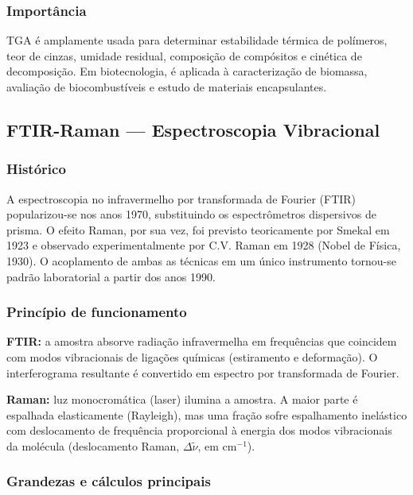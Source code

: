 \subsubsection*{Importância}

TGA é amplamente usada para determinar estabilidade térmica de polímeros,
teor de cinzas, umidade residual, composição de compósitos e cinética de
decomposição. Em biotecnologia, é aplicada à caracterização de biomassa,
avaliação de biocombustíveis e estudo de materiais encapsulantes.

\subsection{FTIR-Raman --- Espectroscopia Vibracional}

\subsubsection*{Histórico}

A espectroscopia no infravermelho por transformada de Fourier (FTIR)
popularizou-se nos anos 1970, substituindo os espectrômetros dispersivos
de prisma. O efeito Raman, por sua vez, foi previsto teoricamente por
Smekal em 1923 e observado experimentalmente por C.V. Raman em 1928
(Nobel de Física, 1930). O acoplamento de ambas as técnicas em um único
instrumento tornou-se padrão laboratorial a partir dos anos 1990.

\subsubsection*{Princípio de funcionamento}

\textbf{FTIR:} a amostra absorve radiação infravermelha em frequências que
coincidem com modos vibracionais de ligações químicas (estiramento e
deformação). O interferograma resultante é convertido em espectro por
transformada de Fourier.

\textbf{Raman:} luz monocromática (laser) ilumina a amostra. A maior parte
é espalhada elasticamente (Rayleigh), mas uma fração sofre espalhamento
inelástico com deslocamento de frequência proporcional à energia dos modos
vibracionais da molécula (deslocamento Raman, $\Delta\tilde{\nu}$, em
cm$^{-1}$).

\subsubsection*{Grandezas e cálculos principais}

